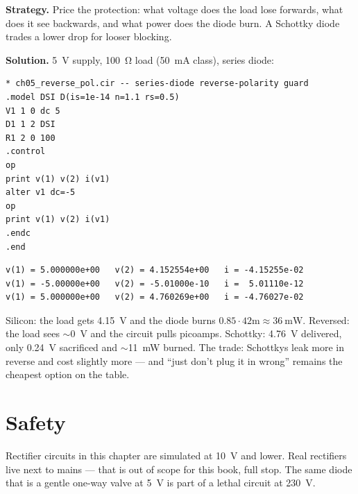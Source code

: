 \begin{example}\label{ex:revpol}
\textbf{Strategy.} Price the protection: what voltage does the load
lose forwards, what does it see backwards, and what power does the
diode burn. A Schottky diode trades a lower drop for looser blocking.

\textbf{Solution.} \qty{5}{\volt} supply, \qty{100}{\ohm} load
(\qty{50}{\milli\ampere} class), series diode:

\begin{lstlisting}[caption={\ttfamily code/ch05\_reverse\_pol.cir ---
\texttt{alter} re-runs the operating point with the supply flipped;
\texttt{ch05\_reverse\_pol\_sch.cir} swaps the silicon model for
Schottky.},label=lst:revpol]
* ch05_reverse_pol.cir -- series-diode reverse-polarity guard
.model DSI D(is=1e-14 n=1.1 rs=0.5)
V1 1 0 dc 5
D1 1 2 DSI
R1 2 0 100
.control
op
print v(1) v(2) i(v1)
alter v1 dc=-5
op
print v(1) v(2) i(v1)
.endc
.end
\end{lstlisting}

\begin{lstlisting}[caption={Outputs, verbatim: silicon forward,
reversed, then the Schottky run.}]
v(1) = 5.000000e+00   v(2) = 4.152554e+00   i = -4.15255e-02
v(1) = -5.00000e+00   v(2) = -5.01000e-10   i =  5.01110e-12
v(1) = 5.000000e+00   v(2) = 4.760269e+00   i = -4.76027e-02
\end{lstlisting}

Silicon: the load gets \qty{4.15}{\volt} and the diode burns
$0.85\cdot42\text{m}\approx\qty{36}{\milli\watt}$. Reversed: the load
sees $\sim$\qty{0}{\volt} and the circuit pulls picoamps. Schottky:
\qty{4.76}{\volt} delivered, only \qty{0.24}{\volt} sacrificed and
$\sim$\qty{11}{\milli\watt} burned. The trade: Schottkys leak more in
reverse and cost slightly more --- and ``just don't plug it in wrong''
remains the cheapest option on the table.
\end{example}

\section{Safety}\label{sec:diode-safety}

\begin{rulebox}
Rectifier circuits in this chapter are simulated at \qty{10}{\volt} and
lower. Real rectifiers live next to mains --- that is out of scope for
this book, full stop. The same diode that is a gentle one-way valve at
\qty{5}{\volt} is part of a lethal circuit at \qty{230}{\volt}.
\end{rulebox}

